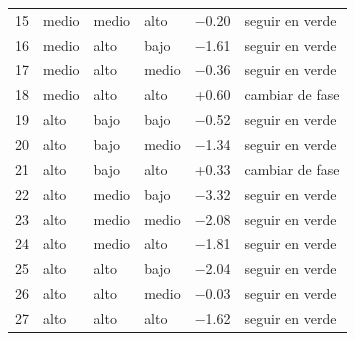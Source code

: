 \begin{table}[H]
\begin{tabular}{@{}rlllrl@{}}
15 & medio & medio & alto & $-$0.20 & \textcolor{blue!70!black}{seguir en verde} \\
16 & medio & alto & bajo & $-$1.61 & \textcolor{blue!70!black}{seguir en verde} \\
17 & medio & alto & medio & $-$0.36 & \textcolor{blue!70!black}{seguir en verde} \\
18 & medio & alto & alto & +0.60 & \textcolor{red!70!black}{cambiar de fase} \\
\midrule
19 & alto & bajo & bajo & $-$0.52 & \textcolor{blue!70!black}{seguir en verde} \\
20 & alto & bajo & medio & $-$1.34 & \textcolor{blue!70!black}{seguir en verde} \\
21 & alto & bajo & alto & +0.33 & \textcolor{red!70!black}{cambiar de fase} \\
22 & alto & medio & bajo & $-$3.32 & \textcolor{blue!70!black}{seguir en verde} \\
23 & alto & medio & medio & $-$2.08 & \textcolor{blue!70!black}{seguir en verde} \\
24 & alto & medio & alto & $-$1.81 & \textcolor{blue!70!black}{seguir en verde} \\
25 & alto & alto & bajo & $-$2.04 & \textcolor{blue!70!black}{seguir en verde} \\
26 & alto & alto & medio & $-$0.03 & \textcolor{blue!70!black}{seguir en verde} \\
27 & alto & alto & alto & $-$1.62 & \textcolor{blue!70!black}{seguir en verde} \\
\bottomrule
\end{tabular}
\end{table}
